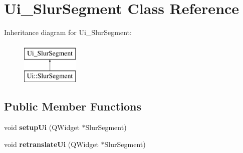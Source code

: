 \hypertarget{class_ui___slur_segment}{}\section{Ui\+\_\+\+Slur\+Segment Class Reference}
\label{class_ui___slur_segment}
Inheritance diagram for Ui\+\_\+\+Slur\+Segment\+:\begin{figure}[H]
\begin{center}
\leavevmode
\includegraphics[height=2.000000cm]{class_ui___slur_segment}
\end{center}
\end{figure}
\subsection*{Public Member Functions}
\begin{DoxyCompactItemize}
\item 
\mbox{\label{class_ui___slur_segment_a15bd172a2bd83928448a68c693e52a29}} 
void {\bfseries setup\+Ui} (Q\+Widget $\ast$Slur\+Segment)
\item 
\mbox{\label{class_ui___slur_segment_a47e942214cd44b42f8585c60a9fde49e}} 
void {\bfseries retranslate\+Ui} (Q\+Widget $\ast$Slur\+Segment)
\end{DoxyCompactItemize}
